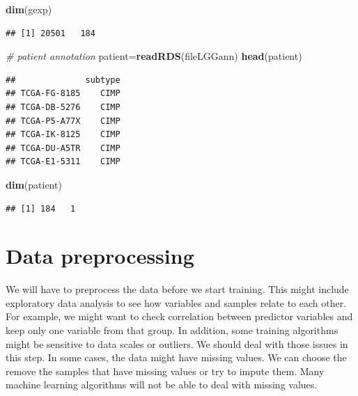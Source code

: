 \documentclass[12pt,]{krantz}
\newenvironment{Shaded}{\begin{snugshade}}{\end{snugshade}}
\newcommand{\CommentTok}[1]{\textcolor[rgb]{0.56,0.35,0.01}{\textit{#1}}}
\newcommand{\KeywordTok}[1]{\textcolor[rgb]{0.13,0.29,0.53}{\textbf{#1}}}
\newcommand{\NormalTok}[1]{#1}
\begin{document}
\begin{Shaded}
\begin{Highlighting}[]
\KeywordTok{dim}\NormalTok{(gexp)}
\end{Highlighting}
\end{Shaded}

\begin{verbatim}
## [1] 20501   184
\end{verbatim}

\begin{Shaded}
\begin{Highlighting}[]
\CommentTok{# patient annotation}
\NormalTok{patient=}\KeywordTok{readRDS}\NormalTok{(fileLGGann)}
\KeywordTok{head}\NormalTok{(patient)}
\end{Highlighting}
\end{Shaded}

\begin{verbatim}
##              subtype
## TCGA-FG-8185    CIMP
## TCGA-DB-5276    CIMP
## TCGA-P5-A77X    CIMP
## TCGA-IK-8125    CIMP
## TCGA-DU-A5TR    CIMP
## TCGA-E1-5311    CIMP
\end{verbatim}

\begin{Shaded}
\begin{Highlighting}[]
\KeywordTok{dim}\NormalTok{(patient)}
\end{Highlighting}
\end{Shaded}

\begin{verbatim}
## [1] 184   1
\end{verbatim}

\hypertarget{data-preprocessing}{%
\section{Data preprocessing}\label{data-preprocessing}}

We will have to preprocess the data before we start training. This might include exploratory data analysis to see how variables and samples relate to each other. For example, we might want to check correlation between predictor variables and keep only one variable from that group. In addition, some training algorithms might be sensitive to data scales or outliers. We should deal with those issues in this step. In some cases, the data might have missing values. We can choose the remove the samples that have missing values or try to impute them. Many machine learning algorithms will not be able to deal with missing values.
\end{document}
